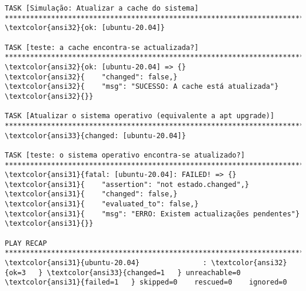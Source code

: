 \documentclass{scrartcl}
\begin{document}
\begin{Verbatim}
TASK [Simulação: Atualizar a cache do sistema] *******************************************************************************************
\textcolor{ansi32}{ok: [ubuntu-20.04]}

TASK [teste: a cache encontra-se actualizada?] *******************************************************************************************
\textcolor{ansi32}{ok: [ubuntu-20.04] => {}
\textcolor{ansi32}{    "changed": false,}
\textcolor{ansi32}{    "msg": "SUCESSO: A cache está atualizada"}
\textcolor{ansi32}{}}

TASK [Atualizar o sistema operativo (equivalente a apt upgrade)] *************************************************************************
\textcolor{ansi33}{changed: [ubuntu-20.04]}

TASK [teste: o sistema operativo encontra-se atualizado?] ********************************************************************************
\textcolor{ansi31}{fatal: [ubuntu-20.04]: FAILED! => {}
\textcolor{ansi31}{    "assertion": "not estado.changed",}
\textcolor{ansi31}{    "changed": false,}
\textcolor{ansi31}{    "evaluated_to": false,}
\textcolor{ansi31}{    "msg": "ERRO: Existem actualizações pendentes"}
\textcolor{ansi31}{}}

PLAY RECAP *******************************************************************************************************************************
\textcolor{ansi31}{ubuntu-20.04}               : \textcolor{ansi32}{ok=3   } \textcolor{ansi33}{changed=1   } unreachable=0    \textcolor{ansi31}{failed=1   } skipped=0    rescued=0    ignored=0



\end{Verbatim}
\end{document}
